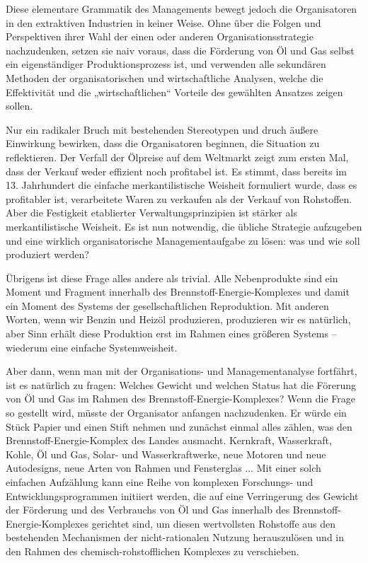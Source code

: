 \documentclass[11pt,a4paper]{article}
\begin{document}
Diese elementare Grammatik des Managements bewegt jedoch die Organisatoren in
den extraktiven Industrien in keiner Weise. Ohne über die Folgen und
Perspektiven ihrer Wahl der einen oder anderen Organisationsstrategie
nachzudenken, setzen sie naiv voraus, dass die Förderung von Öl und Gas selbst
ein eigenständiger Produktionsprozess ist, und verwenden alle sekundären
Methoden der organisatorischen und wirtschaftliche Analysen, welche die
Effektivität und die „wirtschaftlichen“ Vorteile des gewählten Ansatzes zeigen
sollen.

Nur ein radikaler Bruch mit bestehenden Stereotypen und druch äußere
Einwirkung bewirken, dass die Organisatoren beginnen, die Situation zu
reflektieren. Der Verfall der Ölpreise auf dem Weltmarkt zeigt zum ersten Mal,
dass der Verkauf weder effizient noch profitabel ist. Es stimmt, dass bereits
im 13. Jahrhundert die einfache merkantilistische Weisheit formuliert wurde,
dass es profitabler ist, verarbeitete Waren zu verkaufen als der Verkauf von
Rohstoffen. Aber die Festigkeit etablierter Verwaltungsprinzipien ist stärker
als merkantilistische Weisheit. Es ist nun notwendig, die übliche Strategie
aufzugeben und eine wirklich organisatorische Managementaufgabe zu lösen: was
und wie soll produziert werden?

Übrigens ist diese Frage alles andere als trivial. Alle Nebenprodukte sind ein
Moment und Fragment innerhalb des Brennstoff-Energie-Komplexes und damit ein
Moment des Systems der gesellschaftlichen Reproduktion. Mit anderen Worten,
wenn wir Benzin und Heizöl produzieren, produzieren wir es natürlich, aber
Sinn erhält diese Produktion erst im Rahmen eines größeren Systems -- wiederum
eine einfache Systemweisheit.

Aber dann, wenn man mit der Organisations- und Managementanalyse fortfährt,
ist es natürlich zu fragen: Welches Gewicht und welchen Status hat die
Förerung von Öl und Gas im Rahmen des Brennstoff-Energie-Komplexes?  Wenn die
Frage so gestellt wird, müsste der Organisator anfangen nachzudenken. Er würde
ein Stück Papier und einen Stift nehmen und zunächst einmal alles zählen, was
den Brennstoff-Energie-Komplex des Landes ausmacht.  Kernkraft, Wasserkraft,
Kohle, Öl und Gas, Solar- und Wasserkraftwerke, neue Motoren und neue
Autodesigns, neue Arten von Rahmen und Fensterglas ... Mit einer solch
einfachen Aufzählung kann eine Reihe von komplexen Forschungs- und
Entwicklungsprogrammen initiiert werden, die auf eine Verringerung des Gewicht
der Förderung und des Verbrauchs von Öl und Gas innerhalb des
Brennstoff-Energie-Komplexes gerichtet sind, um diesen wertvollsten Rohstoffe
aus den bestehenden Mechanismen der nicht-rationalen Nutzung herauszulösen und
in den Rahmen des chemisch-rohstofflichen Komplexes zu verschieben.
\end{document}
